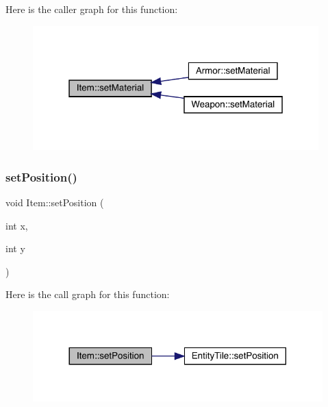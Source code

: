 Here is the caller graph for this function\+:
\nopagebreak
\begin{figure}[H]
\begin{center}
\leavevmode
\includegraphics[width=313pt]{class_item_af8f9e1899f933fc2ae2cdee6c7de0a4e_icgraph}
\end{center}
\end{figure}
\mbox{\label{class_item_af8f03acf491fb71ec8cf1e4248bb4b3d}} 
\subsubsection{\texorpdfstring{set\+Position()}{setPosition()}}
{\footnotesize\ttfamily void Item\+::set\+Position (\begin{DoxyParamCaption}\item[{int}]{x,  }\item[{int}]{y }\end{DoxyParamCaption})}

Here is the call graph for this function\+:
\nopagebreak
\begin{figure}[H]
\begin{center}
\leavevmode
\includegraphics[width=317pt]{class_item_af8f03acf491fb71ec8cf1e4248bb4b3d_cgraph}
\end{center}
\end{figure}
\mbox{\label{class_item_a87100c3d13e81e42e58969f817d591ef}} 
